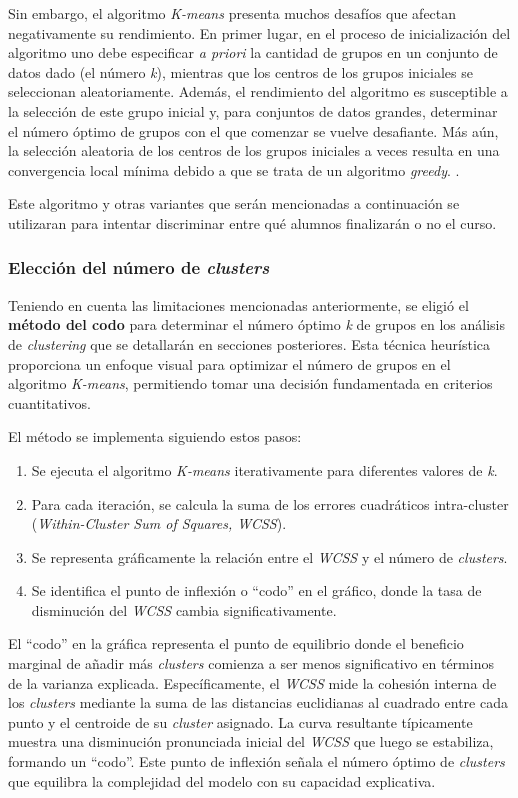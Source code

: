 \documentclass[11pt,a4paper,twoside,openany]{tesis}
\begin{document}
Sin embargo, el algoritmo \emph{K-means} presenta muchos desafíos que afectan negativamente su rendimiento. En primer lugar, en el proceso de inicialización del algoritmo uno debe especificar \emph{a priori} la cantidad de grupos en un conjunto de datos dado (el número \emph{k}), mientras que los centros de los grupos iniciales se seleccionan aleatoriamente. Además, el rendimiento del algoritmo es susceptible a la selección de este grupo inicial y, para conjuntos de datos grandes, determinar el número óptimo de grupos con el que comenzar se vuelve desafiante. Más aún, la selección aleatoria de los centros de los grupos iniciales a veces resulta en una convergencia local mínima debido a que se trata de un algoritmo \emph{greedy}. \cite{kmeans-limitaciones}.

Este algoritmo y otras variantes que serán mencionadas a continuación se utilizaran para intentar discriminar entre qué alumnos finalizarán o no el curso. 

\subsubsection{Elección del número de \emph{clusters}} \textbf{ } 


Teniendo en cuenta las limitaciones mencionadas anteriormente, se eligió el \textbf{método del codo} para determinar el número óptimo \emph{k} de grupos en los análisis de \emph{clustering} que se detallarán en secciones posteriores. Esta técnica heurística proporciona un enfoque visual para optimizar el número de grupos en el algoritmo \emph{K-means}, permitiendo tomar una decisión fundamentada en criterios cuantitativos.

El método se implementa siguiendo estos pasos:
\begin{enumerate}
\item Se ejecuta el algoritmo \emph{K-means} iterativamente para diferentes valores de \emph{k}.
\item Para cada iteración, se calcula la suma de los errores cuadráticos intra-cluster (\emph{Within-Cluster Sum of Squares, WCSS}).
\item Se representa gráficamente la relación entre el \emph{WCSS} y el número de \emph{clusters}.
\item Se identifica el punto de inflexión o ``codo'' en el gráfico, donde la tasa de disminución del \emph{WCSS} cambia significativamente.
\end{enumerate}

El ``codo'' en la gráfica representa el punto de equilibrio donde el beneficio marginal de añadir más \emph{clusters} comienza a ser menos significativo en términos de la varianza explicada. Específicamente, el \emph{WCSS} mide la cohesión interna de los \emph{clusters} mediante la suma de las distancias euclidianas al cuadrado entre cada punto y el centroide de su \emph{cluster} asignado. La curva resultante típicamente muestra una disminución pronunciada inicial del \emph{WCSS} que luego se estabiliza, formando un ``codo''. Este punto de inflexión señala el número óptimo de \emph{clusters} que equilibra la complejidad del modelo con su capacidad explicativa.
\end{document}
